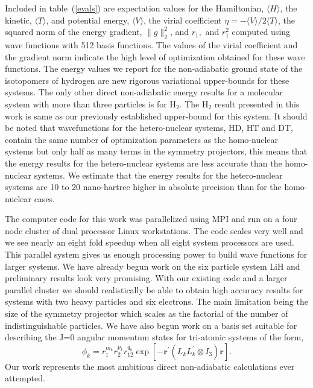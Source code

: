 Included in table~(\ref{evals}) are expectation values for the
Hamiltonian, $\langle H \rangle$, the kinetic, $\langle T \rangle$,
and potential energy, $\langle V \rangle$, the virial coefficient
$\eta=-\langle V \rangle /2\langle T \rangle$, the squared norm of the
energy gradient, $\|g\|_{2}^{2}$, and $r_{1},$ and $r_{1}^{2}$
computed using wave functions with 512 basis functions.  The values of
the virial coefficient and the gradient norm indicate the high level
of optimization obtained for these wave functions.  The energy values
we report for the non-adiabatic ground state of the isotopomers of
hydrogen are new rigorous variational upper-bounds for these systems.
The only other direct non-adiabatic energy results for a molecular
system with more than three particles is for
H$_2$\cite{Wolniewicz95,Bishop77b,Chen95}. The H$_2$ result presented
in this work is same as our previously established upper-bound for
this system\cite{Kinghorn99b}. It should be noted that wavefunctions
for the hetero-nuclear systems, HD, HT and DT, contain the same number of
optimization parameters as the homo-nuclear systems but only half as
many terms in the symmetry projectors, this means that the energy
results for the hetero-nuclear systems are less accurate than the
homo-nuclear systems. We estimate that the energy results for the
hetero-nuclear systems are 10 to 20 nano-hartree higher in absolute
precision than for the homo-nuclear cases.


The computer code for this work was parallelized using MPI and run on
a four node cluster of dual processor Linux workstations.  The code
scales very well and we see nearly an eight fold speedup when all
eight system processors are used. This parallel system gives us enough
processing power to build wave functions for larger systems.  We have
already begun work on the six particle system LiH and preliminary
results look very promising. With our existing code and a larger
parallel cluster we should realistically be able to obtain high
accuracy results for systems with two heavy particles and six
electrons. The main limitation being the size of the symmetry
projector which scales as the factorial of the number of
indistinguishable particles. We have also begun work on a basis set
suitable for describing the J=0 angular momentum states for tri-atomic
systems of the form,
\begin{equation} 
 \phi _k =
  r_{1}^{m_k}r_{2}^{p_k}r_{12}^{q_k} \exp \left[ -\mathbf{r}^{\prime }
      \left( L_kL_k^{\prime }\otimes I_3\right)\mathbf{r}\right].
\end{equation} 
Our work represents the most ambitious direct non-adiabatic calculations
ever attempted.
 

